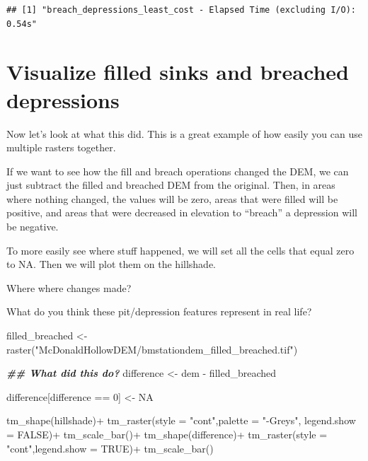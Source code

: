 \documentclass[
]{book}
\newenvironment{Shaded}{\begin{snugshade}}{\end{snugshade}}
\newcommand{\AttributeTok}[1]{\textcolor[rgb]{0.77,0.63,0.00}{#1}}
\newcommand{\ConstantTok}[1]{\textcolor[rgb]{0.00,0.00,0.00}{#1}}
\newcommand{\DecValTok}[1]{\textcolor[rgb]{0.00,0.00,0.81}{#1}}
\newcommand{\DocumentationTok}[1]{\textcolor[rgb]{0.56,0.35,0.01}{\textbf{\textit{#1}}}}
\newcommand{\FunctionTok}[1]{\textcolor[rgb]{0.00,0.00,0.00}{#1}}
\newcommand{\NormalTok}[1]{#1}
\newcommand{\OtherTok}[1]{\textcolor[rgb]{0.56,0.35,0.01}{#1}}
\newcommand{\SpecialCharTok}[1]{\textcolor[rgb]{0.00,0.00,0.00}{#1}}
\newcommand{\StringTok}[1]{\textcolor[rgb]{0.31,0.60,0.02}{#1}}
\begin{document}
\begin{verbatim}
## [1] "breach_depressions_least_cost - Elapsed Time (excluding I/O): 0.54s"
\end{verbatim}

\hypertarget{visualize-filled-sinks-and-breached-depressions}{%
\section{Visualize filled sinks and breached depressions}\label{visualize-filled-sinks-and-breached-depressions}}

Now let's look at what this did. This is a great example of how easily you can use multiple rasters together.

If we want to see how the fill and breach operations changed the DEM, we can just subtract the filled and breached DEM from the original. Then, in areas where nothing changed, the values will be zero, areas that were filled will be positive, and areas that were decreased in elevation to ``breach'' a depression will be negative.

To more easily see where stuff happened, we will set all the cells that equal zero to NA. Then we will plot them on the hillshade.

Where where changes made?

What do you think these pit/depression features represent in real life?

\begin{Shaded}
\begin{Highlighting}[]
\NormalTok{filled\_breached }\OtherTok{\textless{}{-}} \FunctionTok{raster}\NormalTok{(}\StringTok{"McDonaldHollowDEM/bmstationdem\_filled\_breached.tif"}\NormalTok{)}

\DocumentationTok{\#\# What did this do?}
\NormalTok{difference }\OtherTok{\textless{}{-}}\NormalTok{ dem }\SpecialCharTok{{-}}\NormalTok{ filled\_breached}

\NormalTok{difference[difference }\SpecialCharTok{==} \DecValTok{0}\NormalTok{] }\OtherTok{\textless{}{-}} \ConstantTok{NA}

\FunctionTok{tm\_shape}\NormalTok{(hillshade)}\SpecialCharTok{+}
  \FunctionTok{tm\_raster}\NormalTok{(}\AttributeTok{style =} \StringTok{"cont"}\NormalTok{,}\AttributeTok{palette =} \StringTok{"{-}Greys"}\NormalTok{, }\AttributeTok{legend.show =} \ConstantTok{FALSE}\NormalTok{)}\SpecialCharTok{+}
  \FunctionTok{tm\_scale\_bar}\NormalTok{()}\SpecialCharTok{+}
\FunctionTok{tm\_shape}\NormalTok{(difference)}\SpecialCharTok{+}
  \FunctionTok{tm\_raster}\NormalTok{(}\AttributeTok{style =} \StringTok{"cont"}\NormalTok{,}\AttributeTok{legend.show =} \ConstantTok{TRUE}\NormalTok{)}\SpecialCharTok{+}
  \FunctionTok{tm\_scale\_bar}\NormalTok{()}
\end{Highlighting}
\end{Shaded}
\end{document}
